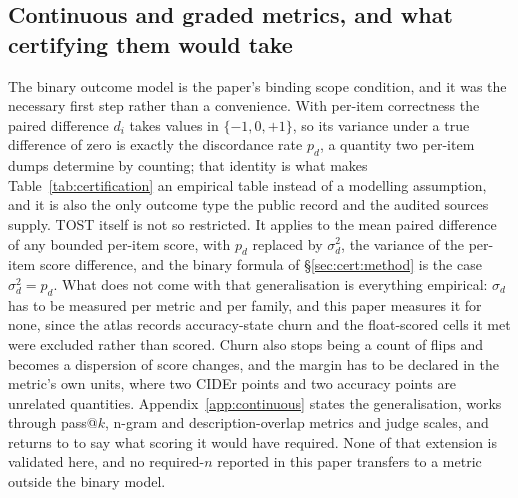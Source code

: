 \subsection{Continuous and graded metrics, and what certifying them would take}
\label{sec:limitations:continuous}

The binary outcome model is the paper's binding scope condition, and it was the
necessary first step rather than a convenience. With per-item correctness the
paired difference $d_i$ takes values in $\{-1,0,+1\}$, so its variance under a
true difference of zero is exactly the discordance rate $p_d$, a quantity two
per-item dumps determine by counting; that identity is what makes
Table~\ref{tab:certification} an empirical table instead of a modelling
assumption, and it is also the only outcome type the public record and the
audited sources supply. TOST itself is not so restricted. It applies to the mean
paired difference of any bounded per-item score, with $p_d$ replaced by
$\sigma_d^2$, the variance of the per-item score difference, and the binary
formula of \S\ref{sec:cert:method} is the case $\sigma_d^2 = p_d$. What does not
come with that generalisation is everything empirical: $\sigma_d$ has to be
measured per metric and per family, and this paper measures it for none, since
the atlas records accuracy-state churn and the float-scored cells it met were
excluded rather than scored. Churn also stops being a count of flips and becomes
a dispersion of score changes, and the margin has to be declared in the metric's
own units, where two CIDEr points and two accuracy points are unrelated
quantities. Appendix~\ref{app:continuous} states the generalisation, works
through pass@$k$, n-gram and description-overlap metrics and judge scales, and
returns to \AuditOutsideFrameworkClaim{} to say what scoring it would have
required. None of that extension is validated here, and no required-$n$ reported
in this paper transfers to a metric outside the binary model.
